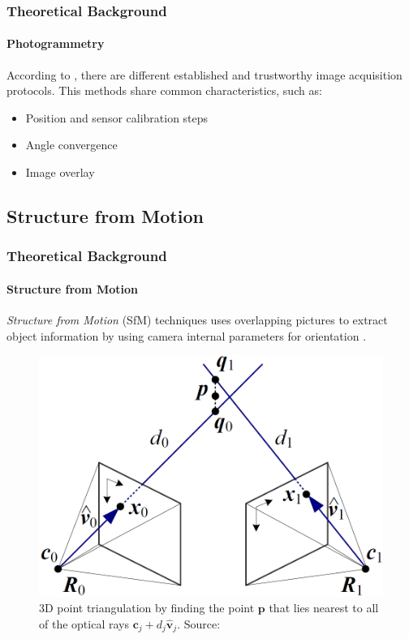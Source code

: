 \documentclass{beamer}
\begin{document}
\begin{frame}
  \frametitle{Theoretical Background}
  \framesubtitle{Photogrammetry}
  \justifying
  According to \citep{murtiyoso2016acquisition}, there are different established and trustworthy image acquisition protocols. This methods share common characteristics, such as:
   
   \begin{itemize}
       \item Position and sensor calibration steps
       \item Angle convergence
       \item Image overlay
   \end{itemize}

\end{frame}

\subsection{Structure from Motion}
\begin{frame}
  \frametitle{Theoretical Background}
  \framesubtitle{Structure from Motion}
  \justifying
  
  \textit{Structure from Motion} (SfM) techniques uses overlapping pictures to extract object information by using camera internal parameters for orientation \citep{micheletti2015structure}.
 
    \begin{figure}
        \centering
        \includegraphics[scale=.17]{images/sfm}
        \caption{3D point triangulation by finding the point $\mathbf{p}$ that lies nearest to all of the optical rays $\mathbf{c}_{j} + d_{j}\mathbf{\hat{v}}_{j} $. Source: \citep{szeliski2010computer}}
    \end{figure}
\end{frame}
\end{document}
